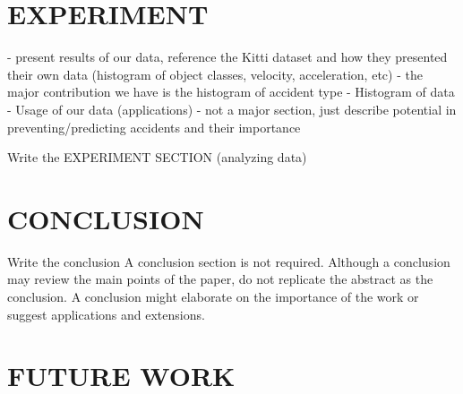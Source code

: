 \documentclass[letterpaper, 10 pt, conference]{IEEEconf}
\newcommand{\todo}[1]{{\color{red}#1}}
\begin{document}
\section{EXPERIMENT}
- present results of our data, reference the Kitti dataset and how they presented their own data (histogram of object classes, velocity, acceleration, etc)
- the major contribution we have is the histogram of accident type
- Histogram of data
- Usage of our data (applications) - not a major section, just describe potential in preventing/predicting accidents and their importance


\todo{Write the EXPERIMENT SECTION (analyzing data)}


\section{CONCLUSION}

\todo{Write the conclusion}
A conclusion section is not required. Although a conclusion may review the main points of the paper, do not replicate the abstract as the conclusion. A conclusion might elaborate on the importance of the work or suggest applications and extensions.

\section{FUTURE WORK}
\end{document}
